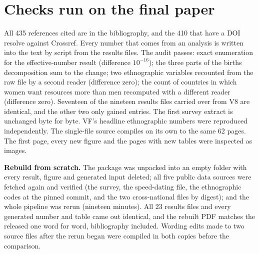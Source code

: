\documentclass[10pt,letterpaper]{extarticle}
\begin{document}
\section{Checks run on the final paper}

All 435 references cited are in the bibliography, and the 410 that have a DOI resolve against Crossref. Every number that
comes from an analysis is written into the text by script from the results files. The audit passes: exact enumeration for
the effective-number result (difference $10^{-16}$); the three parts of the births decomposition sum to the change; two
ethnographic variables recounted from the raw file by a second reader (difference zero); the count of countries in which
women want resources more than men recomputed with a different reader (difference zero). Seventeen of the nineteen results
files carried over from V8 are identical, and the other two only gained entries. The first survey extract is unchanged
byte for byte. VF's headline ethnographic numbers were reproduced independently. The single-file source compiles on its
own to the same 62 pages. The first page, every new figure and the pages with new tables were inspected as images.

\textbf{Rebuild from scratch.} The package was unpacked into an empty folder with every result, figure and generated
input deleted; all five public data sources were fetched again and verified (the survey, the speed-dating file, the
ethnographic codes at the pinned commit, and the two cross-national files by digest); and the whole pipeline was rerun
(nineteen minutes). All 23 results files and every generated number and table came out identical, and the rebuilt PDF
matches the released one word for word, bibliography included. Wording edits made to two source files after the rerun began
were compiled in both copies before the comparison.
\end{document}
